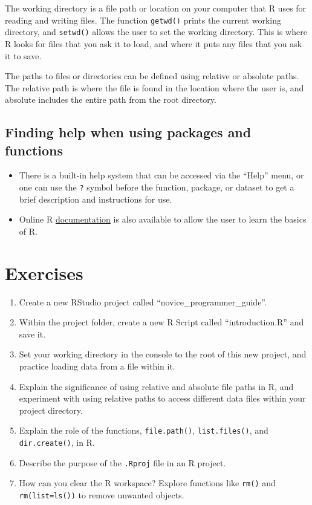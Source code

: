 \documentclass[
  letterpaper,
  DIV=11,
  numbers=noendperiod]{scrreprt}
\begin{document}
The working directory is a file path or location on your computer that R
uses for reading and writing files. The function \texttt{getwd()} prints
the current working directory, and \texttt{setwd()} allows the user to
set the working directory. This is where R looks for files that you ask
it to load, and where it puts any files that you ask it to save.

The paths to files or directories can be defined using relative or
absolute paths. The relative path is where the file is found in the
location where the user is, and absolute includes the entire path from
the root directory.

\subsection{Finding help when using packages and
functions}\label{finding-help-when-using-packages-and-functions}

\begin{itemize}
\item
  There is a built-in help system that can be accessed via the ``Help''
  menu, or one can use the \texttt{?} symbol before the function,
  package, or dataset to get a brief description and instructions for
  use.
\item
  Online R \href{https://cran.r-project.org/manuals.html}{documentation}
  is also available to allow the user to learn the basics of R.
\end{itemize}

\section{Exercises}\label{exercises-3}

\begin{enumerate}
\def\labelenumi{\roman{enumi}.}
\item
  Create a new RStudio project called ``novice\_programmer\_guide''.
\item
  Within the project folder, create a new R Script called
  ``introduction.R'' and save it.
\item
  Set your working directory in the console to the root of this new
  project, and practice loading data from a file within it.
\item
  Explain the significance of using relative and absolute file paths in
  R, and experiment with using relative paths to access different data
  files within your project directory.
\item
  Explain the role of the functions, \texttt{file.path()},
  \texttt{list.files()}, and \texttt{dir.create()}, in R.
\item
  Describe the purpose of the \texttt{.Rproj} file in an R project.
\item
  How can you clear the R workspace? Explore functions like
  \texttt{rm()} and \texttt{rm(list=ls())} to remove unwanted objects.
\end{enumerate}
\end{document}
